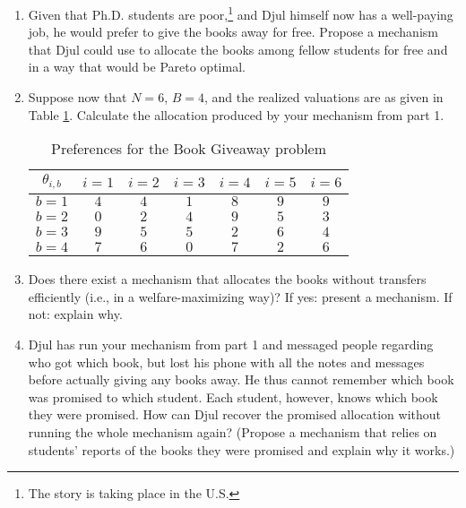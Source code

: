 \documentclass[a4paper]{article}
\begin{document}
	\begin{enumerate}
		\item Given that Ph.D. students are poor,\footnote{The story is taking place in the U.S.} and Djul himself now has a well-paying job, he would prefer to give the books away for free. Propose a mechanism that Djul could use to allocate the books among fellow students for free and in a way that would be Pareto optimal. 
		
		\item Suppose now that $N=6$, $B=4$, and the realized valuations are as given in Table \ref{table:books}. Calculate the allocation produced by your mechanism from part 1.
		\begin{table}[h]
			\begin{center}
				\begin{tabular}{| c || c | c | c | c | c | c |}
					\hline
					$\theta_{i,b}$ & $i=1$ & $i=2$ & $i=3$ & $i=4$ & $i=5$ & $i=6$
					\\ \hline\hline
					$b=1$ & $4$ & $4$ & $1$ & $8$ & $9$ & $9$
					\\ \hline
					$b=2$ & $0$ & $2$ & $4$ & $9$ & $5$ & $3$
					\\ \hline
					$b=3$ & $9$ & $5$ & $5$ & $2$ & $6$ & $4$
					\\ \hline
					$b=4$ & $7$ & $6$ & $0$ & $7$ & $2$ & $6$
					\\ \hline
				\end{tabular}
				\caption{Preferences for the Book Giveaway problem}
				\label{table:books}
			\end{center}
		\end{table}
		
		\item Does there exist a mechanism that allocates the books without transfers efficiently (i.e., in a welfare-maximizing way)? If yes: present a mechanism. If not: explain why.
		
		\item Djul has run your mechanism from part 1 and messaged people regarding who got which book, but lost his phone with all the notes and messages before actually giving any books away. He thus cannot remember which book was promised to which student. Each student, however, knows which book they were promised. How can Djul recover the promised allocation without running the whole mechanism again? (Propose a mechanism that relies on students' reports of the books they were promised and explain why it works.)
	\end{enumerate}
	
\end{document}
